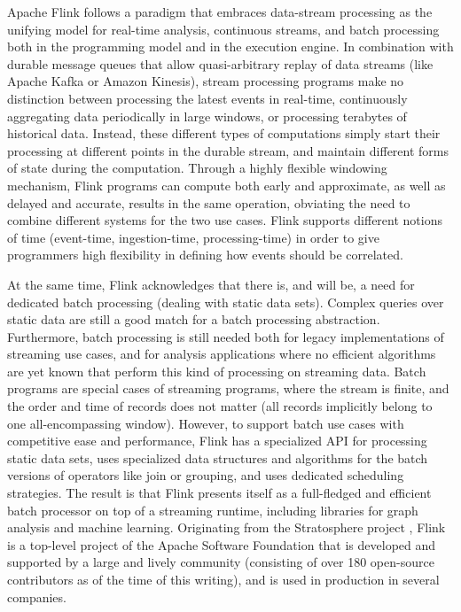 \documentclass[11pt]{article}
\begin{document}
Apache Flink follows a paradigm that embraces data-stream processing as the unifying model for real-time analysis, continuous streams, and batch processing both in the programming model and in the execution engine. In combination with durable message queues that allow quasi-arbitrary replay of data streams (like Apache Kafka or Amazon Kinesis), stream processing programs make no distinction between processing the latest events in real-time, continuously aggregating data periodically in large windows, or processing terabytes of historical data. Instead, these different types of computations simply start their processing at different points in the durable stream, and maintain different forms of state during the computation. Through a highly flexible windowing mechanism, Flink programs can compute both early and approximate, as well as delayed and accurate, results in the same operation, obviating the need to combine different systems for the two use cases. Flink supports different notions of time (event-time, ingestion-time, processing-time) in order to give programmers high flexibility in defining how events should be correlated.
 
At the same time, Flink acknowledges that there is, and will be, a need for dedicated batch processing (dealing with static data sets). Complex queries over static data are still a good match for a batch processing abstraction. Furthermore, batch processing is still needed both for legacy implementations of streaming use cases, and for analysis applications where no efficient algorithms are yet known that perform this kind of processing on streaming data. Batch programs are special cases of streaming programs, where the stream is finite, and the order and time of records does not matter (all records implicitly belong to one all-encompassing window). However, to support batch use cases with competitive ease and performance, Flink has a specialized API for processing static data sets, uses specialized data structures and algorithms for the batch versions of operators like join or grouping, and uses dedicated scheduling strategies. The result is that Flink presents itself as a full-fledged and efficient batch processor on top of a streaming runtime, including libraries for graph analysis and machine learning. 
Originating from the Stratosphere project \cite{stratosphere}, Flink is a top-level project of the Apache Software Foundation that is developed and supported by a large and lively community (consisting of over 180 open-source contributors as of the time of this writing), and is used in production in several companies.
\end{document}
